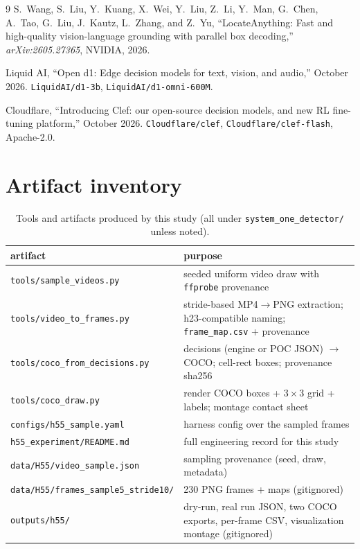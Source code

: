 \documentclass[11pt]{article}
\newcommand{\code}[1]{\texttt{#1}}
\begin{document}
\begin{thebibliography}{9}
S.~Wang, S.~Liu, Y.~Kuang, X.~Wei, Y.~Liu, Z.~Li, Y.~Man, G.~Chen, A.~Tao,
G.~Liu, J.~Kautz, L.~Zhang, and Z.~Yu,
``LocateAnything: Fast and high-quality vision-language grounding with
parallel box decoding,'' \emph{arXiv:2605.27365}, NVIDIA, 2026.

Liquid AI, ``Open d1: Edge decision models for text, vision, and audio,''
October 2026. \code{LiquidAI/d1-3b}, \code{LiquidAI/d1-omni-600M}.

Cloudflare, ``Introducing Clef: our open-source decision models, and new RL
fine-tuning platform,'' October 2026. \code{Cloudflare/clef},
\code{Cloudflare/clef-flash}, Apache-2.0.

\end{thebibliography}

\appendix

\section{Artifact inventory}

\begin{table}[h]
\centering
\caption{Tools and artifacts produced by this study (all under
\code{system\_one\_detector/} unless noted).}
\begin{tabular}{p{5.2cm}p{9.2cm}}
\toprule
artifact & purpose \\
\midrule
\code{tools/sample\_videos.py} & seeded uniform video draw with \code{ffprobe}
provenance \\
\code{tools/video\_to\_frames.py} & stride-based MP4$\to$PNG extraction;
h23-compatible naming; \code{frame\_map.csv} + provenance \\
\code{tools/coco\_from\_decisions.py} & decisions (engine or POC JSON)
$\to$ COCO; cell-rect boxes; provenance sha256 \\
\code{tools/coco\_draw.py} & render COCO boxes + $3\times3$ grid + labels;
montage contact sheet \\
\code{configs/h55\_sample.yaml} & harness config over the sampled frames \\
\code{h55\_experiment/README.md} & full engineering record for this study \\
\code{data/H55/video\_sample.json} & sampling provenance (seed, draw, metadata) \\
\code{data/H55/frames\_sample5\_stride10/} & 230 PNG frames + maps
(gitignored) \\
\code{outputs/h55/} & dry-run, real run JSON, two COCO exports, per-frame CSV,
visualization montage (gitignored) \\
\bottomrule
\end{tabular}
\end{table}
\end{document}
